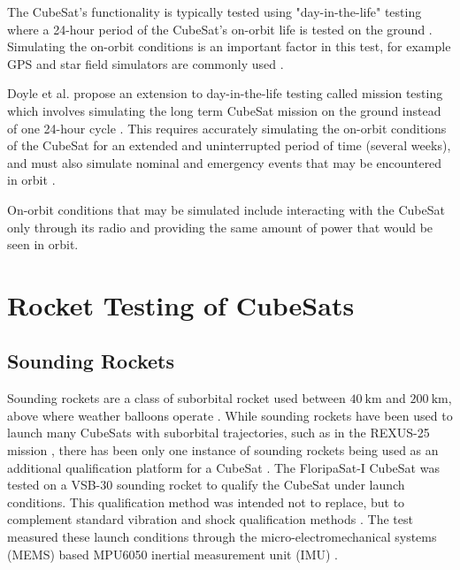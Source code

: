 \documentclass{report}
\begin{document}
The CubeSat's functionality is typically tested using "day-in-the-life" testing where a 24-hour period of the CubeSat's on-orbit life is tested on the ground \cite{venturini2018improving}. Simulating the on-orbit conditions is an important factor in this test, for example GPS and star field simulators are commonly used \cite{venturini2018improving}.

Doyle et al. propose an extension to day-in-the-life testing called mission testing which involves simulating the long term CubeSat mission on the ground instead of one 24-hour cycle \cite{doyle2021mission}. This requires accurately simulating the on-orbit conditions of the CubeSat for an extended and uninterrupted period of time (several weeks), and must also simulate nominal and emergency events that may be encountered in orbit \cite{doyle2021mission}.

On-orbit conditions that may be simulated include interacting with the CubeSat only through its radio and providing the same amount of power that would be seen in orbit.

\section{Rocket Testing of CubeSats}
\subsection{Sounding Rockets}
Sounding rockets are a class of suborbital rocket used between $\SI{40}{\kilo\metre}$ and $\SI{200}{\kilo\metre}$, above where weather balloons operate \cite{seibert2006history}. While sounding rockets have been used to launch many CubeSats with suborbital trajectories, such as in the REXUS-25 mission \cite{pont2019rexus}, there has been only one instance of sounding rockets being used as an additional qualification platform for a CubeSat \cite{slongo2019pre}. The FloripaSat-I CubeSat was tested on a VSB-30 sounding rocket \cite{slongo2019pre} to qualify the CubeSat under launch conditions. This qualification method was intended not to replace, but to complement standard vibration and shock qualification methods \cite{slongo2019pre}. The test measured these launch conditions through the micro-electromechanical systems (MEMS) based MPU6050 inertial measurement unit (IMU) \cite{slongo2019pre}.
\end{document}
